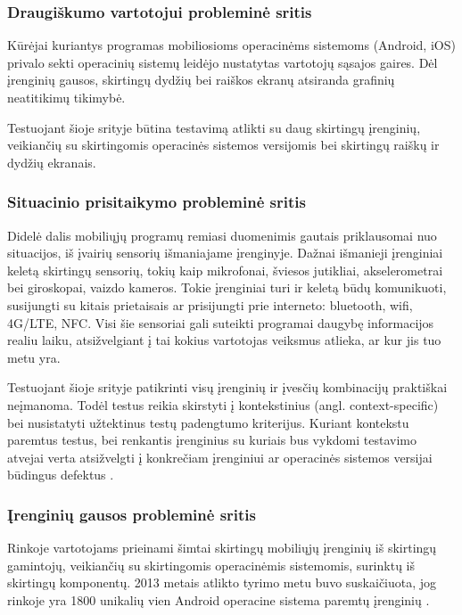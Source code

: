\documentclass{VUMIFPSkursinis}
\begin{document}
\subsubsection{Draugiškumo vartotojui probleminė sritis}
Kūrėjai kuriantys programas mobiliosioms operacinėms sistemoms (Android, iOS) privalo sekti operacinių sistemų leidėjo nustatytas vartotojų sąsajos gaires. Dėl įrenginių gausos, skirtingų dydžių bei raiškos ekranų atsiranda grafinių neatitikimų tikimybė. 

Testuojant šioje srityje būtina testavimą atlikti su daug skirtingų įrenginių, veikiančių su skirtingomis operacinės sistemos versijomis bei skirtingų raiškų ir dydžių ekranais.

\subsubsection{Situacinio prisitaikymo probleminė sritis}
Didelė dalis mobiliųjų programų remiasi duomenimis gautais priklausomai nuo situacijos, iš įvairių sensorių išmaniajame įrenginyje. Dažnai išmanieji įrenginiai keletą skirtingų sensorių, tokių kaip mikrofonai, šviesos jutikliai, akselerometrai bei giroskopai, vaizdo kameros. Tokie įrenginiai turi ir keletą būdų komunikuoti, susijungti su kitais prietaisais ar prisijungti prie interneto: bluetooth, wifi, 4G/LTE, NFC. Visi šie sensoriai gali suteikti programai daugybę informacijos realiu laiku, atsižvelgiant į tai kokius vartotojas veiksmus atlieka, ar kur jis tuo metu yra.

Testuojant šioje srityje patikrinti visų įrenginių ir įvesčių kombinacijų praktiškai neįmanoma. Todėl testus reikia skirstyti į kontekstinius (angl. context-specific) bei nusistatyti užtektinus testų padengtumo kriterijus. Kuriant kontekstu paremtus testus, bei renkantis įrenginius su kuriais bus vykdomi testavimo atvejai verta atsižvelgti į konkrečiam įrenginiui ar operacinės sistemos versijai būdingus defektus \cite{android_bugs}.

\subsubsection{Įrenginių gausos probleminė sritis}
Rinkoje vartotojams prieinami šimtai skirtingų mobiliųjų įrenginių iš skirtingų gamintojų, veikiančių su skirtingomis operacinėmis sistemomis, surinktų iš skirtingų komponentų. 2013 metais atlikto tyrimo metu buvo suskaičiuota, jog rinkoje yra 1800 unikalių vien Android operacine sistema paremtų įrenginių \cite{Muccini:2012:STM:2663608.2663615}.
\end{document}
